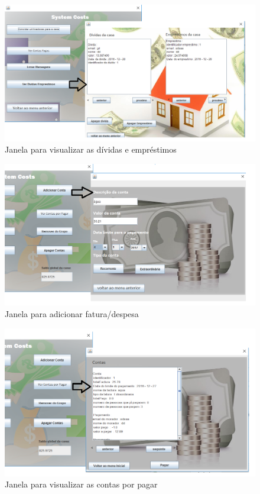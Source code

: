 \begin{figure}[h!]
	\centering
	\includegraphics[scale=0.5]{imagens/interface/verdividaseemprestimosadmin}  
	\caption{Janela para visualizar as dívidas e empréstimos}  
\end{figure}

\begin{figure}[h!]
	\centering
	\includegraphics[scale=0.5]{imagens/interface/adicionarcontaadmin}  
	\caption{Janela para adicionar fatura/despesa}  
\end{figure}

\begin{figure}[h!]
	\centering
	\includegraphics[scale=0.5]{imagens/interface/vercontasporpagaradmin}  
	\caption{Janela para visualizar as contas por pagar}  
\end{figure}

